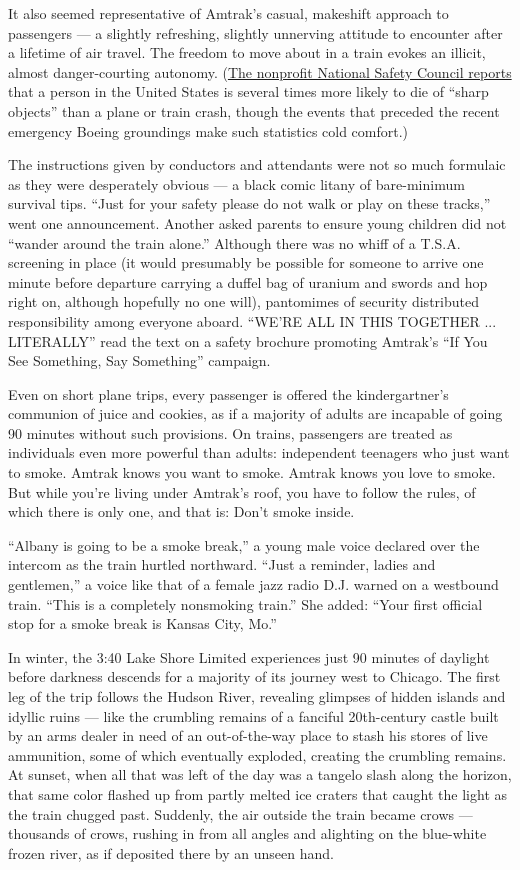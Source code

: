 It also seemed representative of Amtrak's casual, makeshift approach to
passengers --- a slightly refreshing, slightly unnerving attitude to
encounter after a lifetime of air travel. The freedom to move about in a
train evokes an illicit, almost danger-courting autonomy.
(\href{https://injuryfacts.nsc.org/all-injuries/preventable-death-overview/odds-of-dying/}{The
nonprofit National Safety Council reports} that a person in the United
States is several times more likely to die of ``sharp objects'' than a
plane or train crash, though the events that preceded the recent
emergency Boeing groundings make such statistics cold comfort.)

The instructions given by conductors and attendants were not so much
formulaic as they were desperately obvious --- a black comic litany of
bare-minimum survival tips. ``Just for your safety please do not walk or
play on these tracks,'' went one announcement. Another asked parents to
ensure young children did not ``wander around the train alone.''
Although there was no whiff of a T.S.A. screening in place (it would
presumably be possible for someone to arrive one minute before departure
carrying a duffel bag of uranium and swords and hop right on, although
hopefully no one will), pantomimes of security distributed
responsibility among everyone aboard. ``WE'RE ALL IN THIS TOGETHER ...
LITERALLY'' read the text on a safety brochure promoting Amtrak's ``If
You See Something, Say Something'' campaign.

Even on short plane trips, every passenger is offered the
kindergartner's communion of juice and cookies, as if a majority of
adults are incapable of going 90 minutes without such provisions. On
trains, passengers are treated as individuals even more powerful than
adults: independent teenagers who just want to smoke. Amtrak knows you
want to smoke. Amtrak knows you love to smoke. But while you're living
under Amtrak's roof, you have to follow the rules, of which there is
only one, and that is: Don't smoke inside.

``Albany is going to be a smoke break,'' a young male voice declared
over the intercom as the train hurtled northward. ``Just a reminder,
ladies and gentlemen,'' a voice like that of a female jazz radio D.J.
warned on a westbound train. ``This is a completely nonsmoking train.''
She added: ``Your first official stop for a smoke break is Kansas City,
Mo.''

In winter, the 3:40 Lake Shore Limited experiences just 90 minutes of
daylight before darkness descends for a majority of its journey west to
Chicago. The first leg of the trip follows the Hudson River, revealing
glimpses of hidden islands and idyllic ruins --- like the crumbling
remains of a fanciful 20th-century castle built by an arms dealer in
need of an out-of-the-way place to stash his stores of live ammunition,
some of which eventually exploded, creating the crumbling remains. At
sunset, when all that was left of the day was a tangelo slash along the
horizon, that same color flashed up from partly melted ice craters that
caught the light as the train chugged past. Suddenly, the air outside
the train became crows --- thousands of crows, rushing in from all
angles and alighting on the blue-white frozen river, as if deposited
there by an unseen hand.


